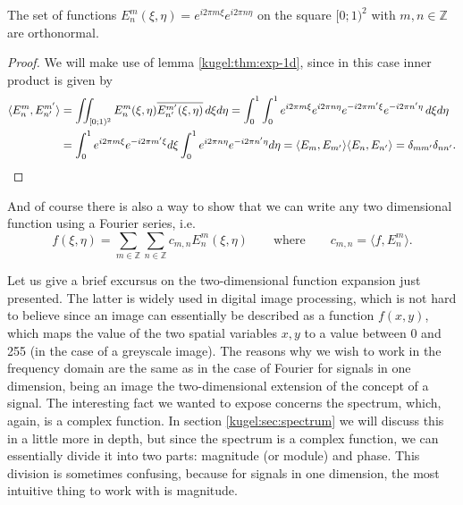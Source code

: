 \begin{lemma}
  The set of functions \(E^m_n(\xi, \eta) = e^{i2\pi m\xi}e^{i2\pi n\eta}\)
  on the square \([0; 1)^2\) with \(m, n \in \mathbb{Z} \) are orthonormal.
\end{lemma}
\begin{proof}
  We will make use of lemma \ref{kugel:thm:exp-1d}, since in this case inner
  product is given by
  \begin{align*}
    \langle E^m_n, E^{m'}_{n'} \rangle
    &= \iint_{[0;1)^2}
        E^m_n(\xi, \eta) \overline{E^{m'}_{n'} (\xi, \eta)}
      \, d\xi d\eta
    = \int_0^1 \int_0^1
        e^{i2\pi m\xi} e^{i2\pi n\eta}
        e^{-i2\pi m'\xi} e^{-i2\pi n'\eta}
      \, d\xi d\eta
      \\
    &= \int_0^1 e^{i2\pi m\xi} e^{-i2\pi m'\xi} d\xi 
      \int_0^1 e^{i2\pi n\eta} e^{-i2\pi n'\eta} d\eta
    = \langle E_m, E_{m'} \rangle \langle E_n, E_{n'} \rangle
    = \delta_{mm'} \delta_{nn'}
    .\qedhere
  \end{align*}
\end{proof}

And of course there is also a way to show that we can write any two
dimensional function using a Fourier series, i.e.
\begin{equation*}
  f(\xi, \eta) = \sum_{m \in \mathbb{Z}} \sum_{n \in \mathbb{Z}}
    c_{m, n} E^m_n(\xi, \eta)
    \qquad\text{where}\qquad
    c_{m,n} = \langle f, E^m_n \rangle.
\end{equation*}

Let us give a brief excursus on the two-dimensional function expansion just
presented. The latter is widely used in digital image processing, which is not
hard to believe since an image can essentially be described as a function
$f(x,y)$, which maps the value of the two spatial variables $x,y$ to a value
between 0 and 255 (in the case of a greyscale image). The reasons why we wish
to work in the frequency domain are the same as in the case of Fourier for
signals in one dimension, being an image the two-dimensional extension of the
concept of a signal. The interesting fact we wanted to expose concerns the
spectrum, which, again, is a complex function. In section
\ref{kugel:sec:spectrum} we will discuss this in a little more in depth, but
since the spectrum is a complex function, we can essentially divide it into
two parts: magnitude (or module) and phase. This division is sometimes
confusing, because for signals in one dimension, the most intuitive thing to
work with is magnitude.


